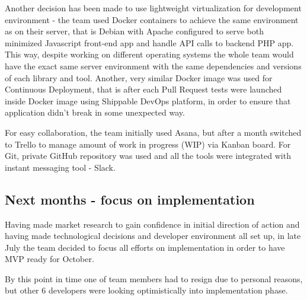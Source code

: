 \documentclass{article}
\begin{document}
Another decision has been made to use lightweight virtualization for development environment - the team used Docker containers to achieve the same environment as on their server, that is Debian with Apache configured to serve both minimized Javascript front-end app and handle API calls to backend PHP app. This way, despite working on different operating systems  the whole team would have the exact same server environment with the same dependencies and versions of each library and tool. Another, very similar Docker image was used for Continuous Deployment, that is after each Pull Request tests were launched inside Docker image using Shippable DevOps platform, in order to ensure that application didn't break in some unexpected way.

For easy collaboration, the team initially used Asana, but after a month switched to Trello to manage amount of work in progress (WIP) via Kanban board. For Git, private GitHub repository was used and all the tools were integrated with instant messaging tool - Slack.

\subsection{Next months - focus on implementation}
Having made market research to gain confidence in initial direction of action and having made technological decisions and developer environment all set up, in late July the team decided to focus all efforts on implementation in order to have MVP ready for October.

By this point in time one of team members had to resign due to personal reasons, but other 6 developers were looking optimistically into implementation phase.
\end{document}
